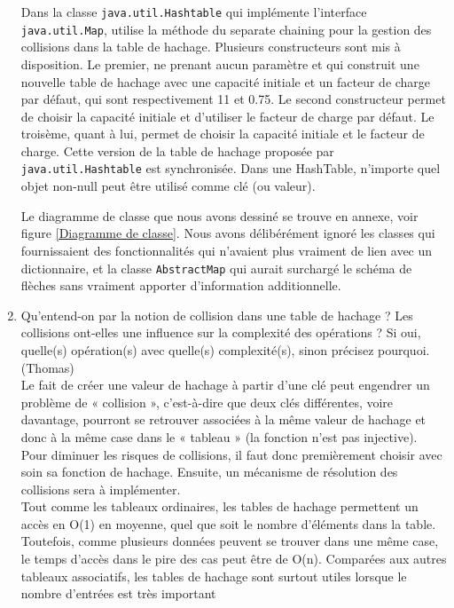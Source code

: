 \documentclass[11pt]{article}
\begin{document}
\begin{enumerate}
Dans la classe \texttt{java.util.Hashtable} qui implémente l'interface \texttt{java.util.Map}, utilise la méthode du {separate chaining} pour la gestion des collisions dans la table de hachage. Plusieurs constructeurs sont mis à disposition. Le premier, ne prenant aucun paramètre et qui construit une nouvelle table de hachage avec une {capacité initiale} et un {facteur de charge} par défaut, qui sont respectivement {11} et {0.75}. Le second constructeur permet de choisir la {capacité initiale} et d'utiliser le {facteur de charge} par défaut. Le troisème, quant à lui, permet de choisir la {capacité initiale} et le {facteur de charge}. Cette version de la table de hachage proposée par \texttt{java.util.Hashtable} est synchronisée. Dans une HashTable, n'importe quel objet non-null peut être utilisé comme clé (ou valeur).

Le diagramme de classe que nous avons dessiné se trouve en annexe, voir figure \ref{Diagramme de classe}. Nous avons délibérément ignoré les classes qui fournissaient des fonctionnalités qui n'avaient plus vraiment de lien avec un dictionnaire, et la classe \texttt{AbstractMap} qui aurait surchargé le schéma de flèches sans vraiment apporter d'information additionnelle.



\item Qu'entend-on par la notion de collision dans une table de hachage ? Les collisions ont-elles une influence sur la complexité des opérations ? Si oui, quelle(s) opération(s) avec quelle(s) complexité(s), sinon précisez pourquoi. (Thomas)\\

Le fait de créer une valeur de hachage à partir d'une clé peut engendrer un problème de « collision », c'est-à-dire que deux clés différentes, voire davantage, pourront se retrouver associées à la même valeur de hachage et donc à la même case dans le « tableau » (la fonction n'est pas injective). Pour diminuer les risques de collisions, il faut donc premièrement choisir avec soin sa fonction de hachage. Ensuite, un mécanisme de résolution des collisions sera à implémenter.\\
Tout comme les tableaux ordinaires, les tables de hachage permettent un accès en O(1) en moyenne, quel que soit le nombre d'éléments dans la table. Toutefois, comme plusieurs données peuvent se trouver dans une même case, le temps d'accès dans le pire des cas peut être de O(n). Comparées aux autres tableaux associatifs, les tables de hachage sont surtout utiles lorsque le nombre d'entrées est très important






\end{enumerate}
\end{document}
